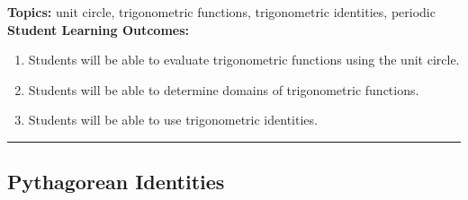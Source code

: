 

\noindent \textbf{Topics:}  unit circle, trigonometric functions, trigonometric identities, periodic\\

\noindent \textbf{Student Learning Outcomes:}
\begin{enumerate}
\item Students will be able to evaluate trigonometric functions using the unit circle.
\item Students will be able to determine domains of trigonometric functions.
\item Students will be able to use trigonometric identities.
\end{enumerate}

\hrule 

\bigskip

\subsection{Pythagorean Identities} ~

